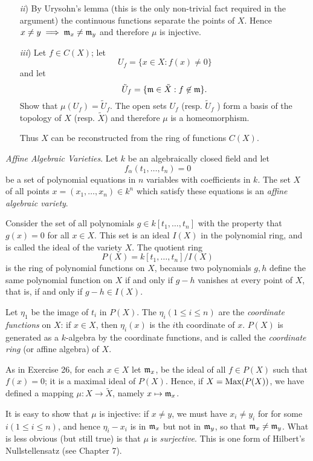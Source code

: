 \documentclass[10pt]{amsart}
\begin{document}
\begin{exercise}
\begin{itemize}
        \item[\emph{ii})] By Urysohn's lemma (this is the only non-trivial fact required in the argument) the continuous functions separate the 
        points of $X$. Hence $x \ne y \implies \mathfrak{m}_x \ne \mathfrak{m}_y$ and therefore $\mu$ is injective.
                
        \item[\emph{iii})] Let $f \in C(X)$; let 
        \[
            U_f = \{ x \in X : f(x) \ne 0\} 
        \]
        and let 
        \[
            \tilde{U}_f = \{\mathfrak{m} \in \tilde{X} : f \not\in \mathfrak{m}\}.
        \]
        Show that $\mu (U_f) = \tilde{U}_f$. The open sets $U_f$ (resp. $\tilde{U}_f$ ) form a basis of the topology of $X$ (resp. $\tilde{X}$) 
        and therefore $\mu$ is a homeomorphism.

        Thus $X$ can be reconstructed from the ring of functions $C(X)$.
    \end{itemize}
\end{exercise}

\begin{exercise}\emph{Affine Algebraic Varieties}.
    Let $k$ be an algebraically closed field and let 
    \[
        f_{\alpha}(t_1, \dots, t_n) = 0
    \]
    be a set of polynomial equations in $n$ variables with coefficients in $k$. 
    The set $X$ of all points $x = (x_1, \dots, x_n) \in k^n$ which satisfy these equations is an 
    \emph{affine algebraic variety}.

    Consider the set of all polynomials $g \in k[t_1, \dots, t_n]$ with the property that $g(x) = 0$ for all 
    $x \in X$. This set is an ideal $I(X)$ in the polynomial ring, and is called the ideal of the variety $X$. 
    The quotient ring
    \[
        P(X) = k[t_1, \dots, t_n]/I(X)
    \]  
    is the ring of polynomial functions on $X$, because two polynomials $g, h$ define the same polynomial function 
    on $X$ if and only if $g - h$ vanishes at every point of $X$, that is, if and only if $g - h \in I(X)$.
    
    Let $\eta_1$ be the image of $t_i$ in $P(X)$. The $\eta_i (1 \le i \le n)$ are the \emph{coordinate functions} on $X$: 
    if $x \in X$, then $\eta_i(x)$ is the $i$th coordinate of $x$. $P(X)$ is generated as a $k$-algebra by the coordinate functions, and is called the 
    \emph{coordinate ring} (or affine algebra) of $X$.
    
    As in Exercise 26, for each $x \in X$ let $\mathfrak{m}_x$, be the ideal of all $f \in P(X)$ such that $f(x) = 0$; 
    it is a maximal ideal of $P(X)$. Hence, if $X= \operatorname{Max}(P(X))$, we have defined a mapping $\mu: X \to \tilde{X}$,  namely $x \mapsto \mathfrak{m}_x$.
    
    It is easy to show that $\mu$ is injective: if $x \ne y$, we must have $x_i \ne y_i$ for for some $i(1 \le i \le n)$, 
    and hence $\eta_i - x_i$ is in $\mathfrak{m}_x$ but not in $\mathfrak{m}_y$, so that $\mathfrak{m}_x \ne \mathfrak{m}_y$. 
    What is less obvious (but still true) is that $\mu$ is \emph{surjective}. This is one form of Hilbert's Nullstellensatz (see Chapter 7).
\end{exercise}
\end{document}
